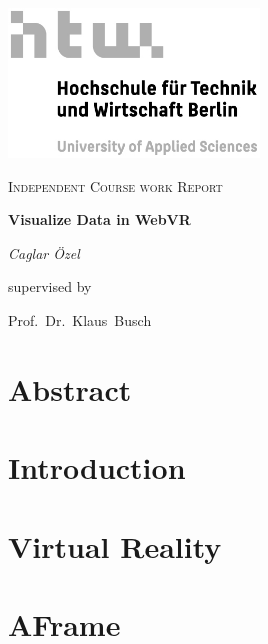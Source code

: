 \documentclass[ a4paper 11pt oneside onecolumn final openany ]{report}
\begin{document}
    \begin{titlepage}
        \begin{center}
            \includegraphics[width=0.5\textwidth]{htw-logo.jpg}\par\vspace{1cm}
            \vspace{1cm}
            {\scshape\Large Independent Course work Report\par}

            \vspace{1.5cm}
            {\Large\bfseries Visualize Data in WebVR }

            \vspace{2cm}
            {\Large\itshape Caglar Özel\par}

            \vfill

            supervised by\par
            Prof.\ Dr.\ Klaus\ Busch
            \vfill
        \end{center}
    \end{titlepage}

    \tableofcontents

    \newpage

    \chapter{Abstract}
    

    \chapter{Introduction}
    

    \chapter{Virtual Reality}
    

    \chapter{AFrame}
    
\end{document}
